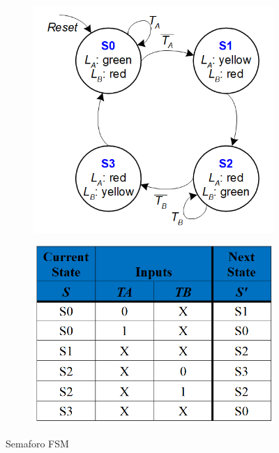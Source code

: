 \documentclass{article}
\begin{document}
    \begin{figure}[ht]
    \begin{minipage}[t]{0.49\textwidth}
        \centering
        \begin{figure}[H]
        \centering
        \includegraphics[width=\linewidth]{semaforo.png}
        \end{figure}
        \label{fig:semaforo_fsm}
    \end{minipage}
    \begin{minipage}[t]{0.49\textwidth}
    \centering
    \begin{figure}[H]
    \centering
    \includegraphics[width=\linewidth]{semaforo_tab.png}
    \end{figure}
    \label{fig:semaforo_tab}
    \end{minipage}
    \caption{Semaforo FSM}
    \end{figure}
\end{document}
